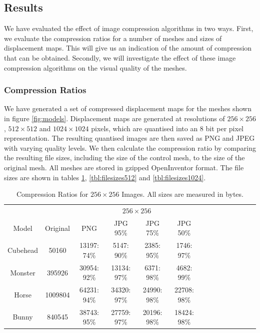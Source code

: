 \subsection{\label{sec:dispmapanim:compression:results}Results}

We have evaluated the effect of image compression algorithms in two ways. First, we evaluate the compression ratios for a number of meshes and sizes of displacement maps. This will give us an indication of the amount of compression that can be obtained. Secondly, we will investigate the effect of these image compression algorithms on the visual quality of the meshes.

\subsubsection{\label{sec:dispmapanim:compression:results:ratios}Compression Ratios}

We have generated a set of compressed displacement maps for the meshes shown in figure \ref{fig:models}. Displacement maps are generated at resolutions of $256\times256$, $512\times512$ and $1024\times1024$ pixels, which are quantised into an 8 bit per pixel representation. The resulting quantised images are then saved as PNG and JPEG with varying quality levels. We then calculate the compression ratio by comparing the resulting file sizes, including the size of the control mesh, to the size of the original mesh. All meshes are stored in gzipped OpenInventor format. The file sizes are shown in tables \ref{tbl:filesizes256}, \ref{tbl:filesizes512} and \ref{tbl:filesizes1024}.

\begin{table}
\begin{center}
\begin{tabular}{c||c|cccc|cccc|cccc}
 & & \multicolumn{4}{|c|}{$256\times256$} \\
Model & Original & PNG & JPG 95\% & JPG 75\% & JPG 50\% \\
\hline
Cubehead & 50160 & 
13197: 74\% & 5147: 90\% & 2385: 95\% & 1746: 97\% \\
Monster & 395926 & 
30954: 92\% & 13134: 97\% & 6371: 98\% & 4682: 99\% \\
Horse & 1009804 & 
64231: 94\% & 34320: 97\% & 24990: 98\% & 22708: 98\% \\
Bunny & 840545 & 
38743: 95\% & 27759: 97\% & 20196: 98\% & 18424: 98\% 
\end{tabular}
\caption[Compression Ratios for $256\times256$ Images.]{\label{tbl:filesizes256} Compression Ratios for $256\times256$ Images. All sizes are measured in bytes.}
\end{center}
\end{table}

